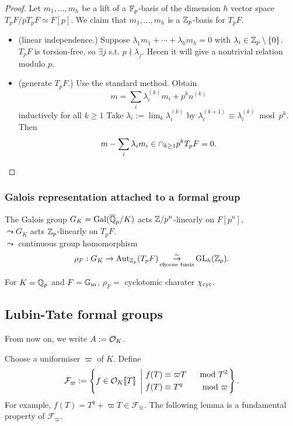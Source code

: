 \begin{proof}
    Let $m_1, \dots, m_h$ be a lift of a $\mathbb{F}_p$-basis of the dimension $h$ vector space $T_pF/pT_pF\simeq F[p]$.
    We claim that $m_1, \dots, m_h$ is a $\mathbb{Z}_p$-basis for $T_pF$.
    \begin{itemize}
        \item (linear independence.)
        Suppose $\lambda_1m_1 + \cdots + \lambda_h m_h = 0$ with $\lambda_i\in\mathbb{Z}_p\setminus \{0\}$.
        $T_pF$ is torsion-free, so $\exists j$ s.t. $p\nmid \lambda_j$.
        Hecen it will give a nontrivial relation modulo $p$.
        \item (generate $T_pF$.)
        Use the standard method.
        Obtain \[m = \sum_i \lambda_i^{(k)} m_i + p^kn^{(k)}\] inductively for all $k\ge 1$
        Take $\lambda_i := \lim_k\lambda_i^{(k)}$
        by $\lambda_i^{(k+1)}\equiv \lambda_i^{(k)}\bmod p^{k}$.
        Then \[m - \sum_{i}\lambda_im_i\in\cap_{k\ge 1}p^kT_pF = 0.\qedhere\]
    \end{itemize}
\end{proof}


\subsubsection{Galois representation attached to a formal group}
The Galois group $G_K = \operatorname{Gal}(\overline{\mathbb{Q}}_p/K)$ acts $\mathbb{Z}/p^n$-linearly on $F[p^n]$,\\
$\leadsto G_K$ acts $\mathbb{Z}_p$-linearly on $T_pF$.\\
$\leadsto$ continuous group homomorphism \[\rho_F : G_K\to\operatorname{Aut}_{\mathbb{Z}_p}(T_pF)\mathop{\stackrel{\sim}{\rightarrow}}_{\text{choose basis}} \operatorname{GL}_h(\mathbb{Z}_p).\]
\begin{example}
    For $K = \mathbb{Q}_p$ and $F = {\mathbb{G}_{\mathrm{m}}}$, $\rho_F = $ cyclotomic charater $\chi_{\mathrm{cyc}}$.
\end{example}






\subsection{Lubin-Tate formal groups}
From now on, we write $A := \mathcal{O}_K$.

Choose a uniformiser $\varpi$ of $K$. Define
\[\mathcal{F}_\varpi := \left\{f\in\mathcal{O}_K\llbracket T \rrbracket\ \left|\ \begin{aligned}
    &f(T) \equiv \varpi T&\mod {T^2} \\
    &f(T)\equiv T^q&\mod \varpi
\end{aligned}\right.\right\}.\]
For example, $f(T) = T^q + \varpi T\in\mathcal{F}_\varpi$.
The following lemma is a fundamental property of $\mathcal{F}_\varpi$.

